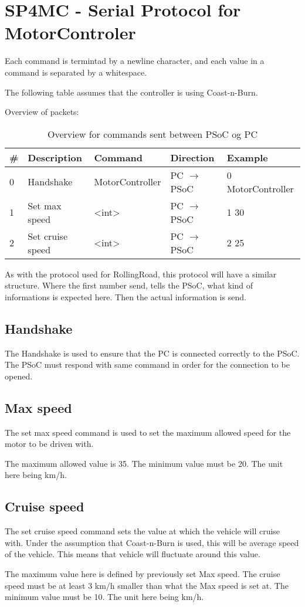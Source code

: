 
\section{SP4MC - Serial Protocol for MotorControler}
Each command is termintad by a newline character, and each value in a command is separated by a whitespace.

The following table assumes that the controller is using Coast-n-Burn.

Overview of packets:
\begin{table}[h!]
	\centering
	\label{Protocol:overviewMC}
	\begin{tabular}{l|llll}
		\# & Description 		& Command         & Direction             & Example     		\\\hline
		0  & Handshake   		& MotorController & PC $\rightarrow$ PSoC & 0 MotorController 	\\
		1  & Set max speed 	    & <int>           & PC $\rightarrow$ PSoC & 1 30 				\\
		2  & Set cruise speed	& <int>           & PC $\rightarrow$ PSoC & 2 25       			\\
	\end{tabular}
	\caption{Overview for commands sent between PSoC og PC}
\end{table}

As with the protocol used for RollingRoad, this protocol will have a similar structure. Where the first number send, tells the PSoC, what kind of informations is expected here. Then the actual information is send. 

\subsection{Handshake}
The Handshake is used to ensure that the PC is connected correctly to the PSoC. The PSoC must respond with same command in order for the connection to be opened.

\subsection{Max speed}
The set max speed command is used to set the maximum allowed speed for the motor to be driven with. 

The maximum allowed value is 35. The minimum value must be 20. The unit here being km/h.

\subsection{Cruise speed}
The set cruise speed command sets the value at which the vehicle will cruise with. Under the assumption that Coast-n-Burn is used, this will be average speed of the vehicle. This means that vehicle will fluctuate around this value.

The maximum value here is defined by previously set Max speed. The cruise speed must be at least 3 km/h smaller than what the Max speed is set at. The minimum value must be 10. The unit here being km/h.


